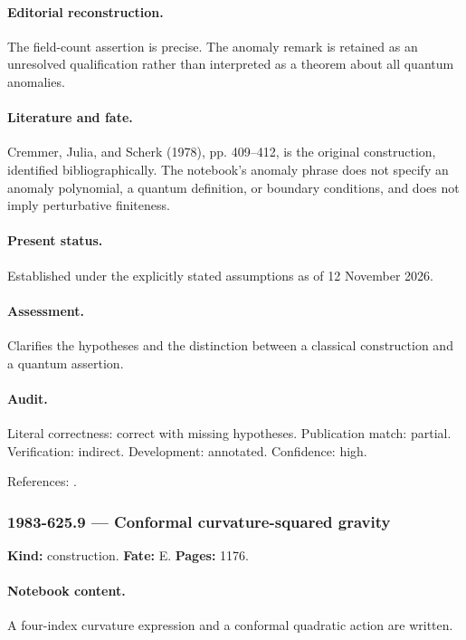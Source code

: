 \paragraph{Editorial reconstruction.} The field-count assertion is precise. The anomaly remark is retained as an unresolved qualification rather than interpreted as a theorem about all quantum anomalies.

\paragraph{Literature and fate.} Cremmer, Julia, and Scherk (1978), pp. 409–412, is the original construction, identified bibliographically. The notebook’s anomaly phrase does not specify an anomaly polynomial, a quantum definition, or boundary conditions, and does not imply perturbative finiteness.

\paragraph{Present status.} Established under the explicitly stated assumptions as of 12 November 2026.

\paragraph{Assessment.} Clarifies the hypotheses and the distinction between a classical construction and a quantum assertion.

\paragraph{Audit.} Literal correctness: correct with missing hypotheses. Publication match: partial. Verification: indirect. Development: annotated. Confidence: high.

\noindent References: \citep{cremmerjuliascherk1978eleven}.\par

\subsubsection{1983-625.9 --- Conformal curvature-squared gravity}

\label{item:1983-625.9}

\noindent\textbf{Kind:} construction. \textbf{Fate:} E. \textbf{Pages:} 1176.\par

\paragraph{Notebook content.} A four-index curvature expression and a conformal quadratic action are written.

